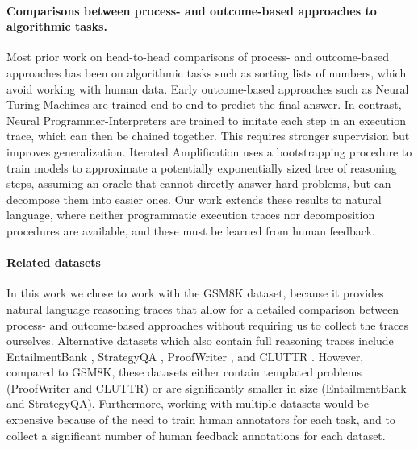 \documentclass[11pt, a4paper, logo]{deepmind}
\begin{document}
{\paragraph{Comparisons between process- and outcome-based approaches to algorithmic tasks.}
Most prior work on head-to-head comparisons of process- and outcome-based approaches has been on algorithmic tasks such as sorting lists of numbers, which avoid working with human data.
Early outcome-based approaches such as Neural Turing Machines \citep{graves2014neural} are trained end-to-end to predict the final answer.
In contrast, Neural Programmer-Interpreters \citep{reed2015neural, li2016neural, cai2017making} are trained to imitate each step in an execution trace, which can then be chained together. This requires stronger supervision but improves generalization.
Iterated Amplification \citep{christiano2018supervising} uses a bootstrapping procedure to train models to approximate a potentially exponentially sized tree of reasoning steps, assuming an oracle that cannot directly answer hard problems, but can decompose them into easier ones. Our work extends these results to natural language, where neither programmatic execution traces nor decomposition procedures are available, and these must be learned from human feedback.


\paragraph{Related datasets} In this work we chose to work with the GSM8K dataset, because it provides natural language reasoning traces that allow for a detailed comparison between process- and outcome-based approaches without requiring us to collect the traces ourselves. Alternative datasets which also contain full reasoning traces include EntailmentBank \citep{Dalvi2021ExplainingAW}, StrategyQA \citep{geva2021strategyqa}, ProofWriter \citep{tafjord2020proofwriter}, and CLUTTR \citep{gontier2020measuring}. However, compared to GSM8K, these datasets either contain templated problems (ProofWriter and CLUTTR) or are significantly smaller in size (EntailmentBank and StrategyQA). Furthermore, working with multiple datasets would be expensive because of the need to train human annotators for each task, and to collect a significant number of human feedback annotations for each dataset.




}
\end{document}
